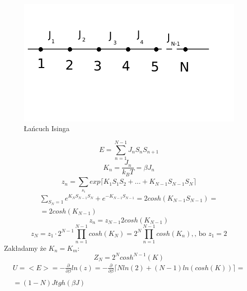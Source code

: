 \documentclass{article}
\begin{document}
		\begin{figure}[ht]
			\label{fig:fig1}
			\centering
			\includegraphics[scale=0.5]{lancuch_isinga.jpeg}
			\caption{Łańcuch Isinga}
		\end{figure}
		\begin{equation}
			E = \sum_{n=1}^{N-1}J_nS_nS_{n+1}
		\end{equation}
		\begin{equation}
		K_n = \frac{J_n}{k_BT} = \beta J_n
		\end{equation}
		\begin{equation}
			z_n = \sum_{s_i}^{}exp\lceil K_1S_1S_2 + ... + K_{N-1}S_{N-1}S_N \rceil
		\end{equation}
		\begin{equation}
			\begin{array}{cc}
			\sum_{S_N = 1}^{} e^{K_NS_{N-1}S_N} + e^{-K_{N-1}S_{N-1}} = 2cosh(K_{N-1}S_{N-1}) = \\
			= 2cosh(K_{N-1})
			\end{array}			
		\end{equation}
		\begin{equation}
		z_n = z_{N-1}2cosh(K_{N-1})
		\end{equation}
		\begin{equation}
			z_N = z_1 \cdot 2^{N-1} \prod_{n=1}^{N-1}cosh(K_N) = 2^N \prod_{n=1}^{N-1}cosh(K_n), 
			\text{, bo } z_1 = 2
		\end{equation}
		Zakładamy że $ K_n = K_m $:
		\begin{equation}
			Z_N = 2^Ncosh^{N-1}(K)
		\end{equation}
		\begin{equation}
		\begin{array}{cc}
			U = <E> = -\frac{\partial}{\partial \beta} ln(z) = -\frac{\partial}{\partial \beta}
			\lceil Nln(2) + (N-1)ln(cosh(K))\rceil = \\ \\
			= (1 - N)Jtgh(\beta J)
		\end{array}		
		\end{equation}
\end{document}

